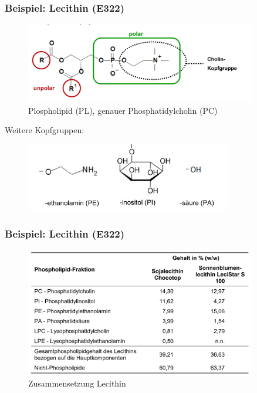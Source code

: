\documentclass{beamer} %
\begin{document}
\begin{frame}
\frametitle{Beispiel: Lecithin (E322)}
\begin{figure}
\centering
\includegraphics[width = 0.9\textwidth]{Lecithin.JPG}
\caption{Plospholipid (PL), genauer Phosphatidylcholin (PC) }
\end{figure}
Weitere Kopfgruppen:
\begin{figure}[h]
\centering
\includegraphics[width = 0.8\textwidth]{Kopfgruppen.JPG}
\end{figure}
\end{frame}

\begin{frame}
\frametitle{Beispiel: Lecithin (E322)}
\begin{figure}
\centering
\includegraphics[width = 0.9\textwidth]{ZusammensetzungLecithin.JPG}
\caption{Zusammensetzung Lecithin}
\end{figure}
\end{frame}

\end{document}
